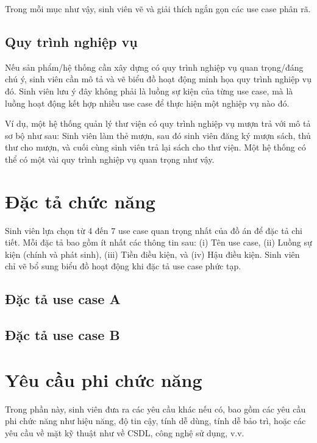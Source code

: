 \documentclass[../LuanVan.tex]{subfiles}
\begin{document}
Trong mỗi mục như vậy, sinh viên vẽ và giải thích ngắn gọn các use case phân rã.

\subsection{Quy trình nghiệp vụ}
\label{subsection:2.2.3}
Nếu sản phẩm/hệ thống cần xây dựng có quy trình nghiệp vụ quan trọng/đáng chú ý, sinh viên cần mô tả và vẽ biểu đồ hoạt động minh họa quy trình nghiệp vụ đó. Sinh viên lưu ý đây không phải là luồng sự kiện của từng use case, mà là luồng hoạt động kết hợp nhiều use case để thực hiện một nghiệp vụ nào đó.

Ví dụ, một hệ thống quản lý thư viện có quy trình nghiệp vụ mượn trả với mô tả sơ bộ như sau: Sinh viên làm thẻ mượn, sau đó sinh viên đăng ký mượn sách, thủ thư cho mượn, và cuối cùng sinh viên trả lại sách cho thư viện. Một hệ thống có thể có một vài quy trình nghiệp vụ quan trọng như vậy.
\section{Đặc tả chức năng}
\label{section:2.3}
Sinh viên lựa chọn từ 4 đến 7 use case quan trọng nhất của đồ án để đặc tả chi tiết. Mỗi đặc tả bao gồm ít nhất các thông tin sau: (i) Tên use case, (ii) Luồng sự kiện (chính và phát sinh), (iii) Tiền điều kiện, và (iv) Hậu điều kiện. Sinh viên chỉ vẽ bổ sung biểu đồ hoạt động khi đặc tả use case phức tạp.
\subsection{Đặc tả use case A}
\hfill
\subsection{Đặc tả use case B}
\hfill

\section{Yêu cầu phi chức năng}
\label{section:2.4}
Trong phần này, sinh viên đưa ra các yêu cầu khác nếu có, bao gồm các yêu cầu phi chức năng như hiệu năng, độ tin cậy, tính dễ dùng, tính dễ bảo trì, hoặc các yêu cầu về mặt kỹ thuật như về CSDL, công nghệ sử dụng, v.v.


\end{document}
